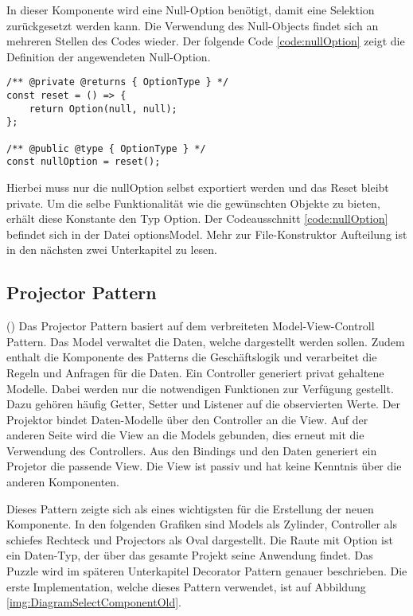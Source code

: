In dieser Komponente wird eine Null-Option benötigt, damit eine Selektion zurückgesetzt werden kann.
Die Verwendung des Null-Objects findet sich an mehreren Stellen des Codes wieder.
Der folgende Code \ref{code:nullOption} zeigt die Definition der angewendeten Null-Option.

\begin{lstlisting}[style = htmlcssjs, caption = Null-Option, label = code:nullOption]
/** @private @returns { OptionType } */
const reset = () => {
    return Option(null, null);
};

/** @public @type { OptionType } */
const nullOption = reset();
\end{lstlisting}

Hierbei muss nur die nullOption selbst exportiert werden und das Reset bleibt private.
Um die selbe Funktionalität wie die gewünschten Objekte zu bieten, erhält diese Konstante den Typ Option.
Der Codeausschnitt \ref{code:nullOption} befindet sich in der Datei optionsModel.
Mehr zur File-Konstruktor Aufteilung ist in den nächsten zwei Unterkapitel zu lesen.

\subsection{Projector Pattern}

(\cite{projectorPattern}) Das Projector Pattern basiert auf dem verbreiteten Model-View-Controll Pattern.
Das Model verwaltet die Daten, welche dargestellt werden sollen.
Zudem enthalt die Komponente des Patterns die Geschäftslogik und verarbeitet die Regeln und Anfragen für die Daten.
Ein Controller generiert privat gehaltene Modelle.
Dabei werden nur die notwendigen Funktionen zur Verfügung gestellt.
Dazu gehören häufig Getter, Setter und Listener auf die observierten Werte.
Der Projektor bindet Daten-Modelle über den Controller an die View.
Auf der anderen Seite wird die View an die Models gebunden, dies erneut mit die Verwendung des Controllers.
Aus den Bindings und den Daten generiert ein Projetor die passende View.
Die View ist passiv und hat keine Kenntnis über die anderen Komponenten.

Dieses Pattern zeigte sich als eines wichtigsten für die Erstellung der neuen Komponente.
In den folgenden Grafiken sind Models als Zylinder, Controller als schiefes Rechteck und Projectors als Oval dargestellt.
Die Raute mit Option ist ein Daten-Typ, der über das gesamte Projekt seine Anwendung findet.
Das Puzzle wird im späteren Unterkapitel Decorator Pattern genauer beschrieben.
Die erste Implementation, welche dieses Pattern verwendet, ist auf Abbildung \ref{img:DiagramSelectComponentOld}.

